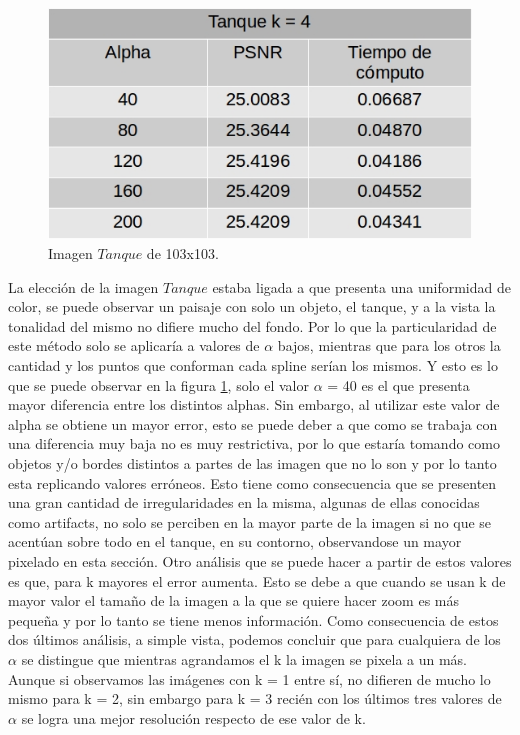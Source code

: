 \documentclass[a4paper]{article}
\newcounter{col}
\begin{document}
\begin{figure}[H]
    \centering
    \includegraphics[scale=0.4]{imagenes/tanque4.jpg}
    \caption{Imagen $Tanque$ de 103x103.}
	\label{tanquee}
    \end{figure}    
    
La elección de la imagen $Tanque$ estaba ligada a que presenta una uniformidad de color, se puede observar un paisaje con solo un objeto, el tanque, y a la vista la tonalidad del mismo no difiere mucho del fondo. Por lo que la particularidad de este método solo se aplicaría a valores de $\alpha$ bajos, mientras que para los otros la cantidad y los puntos que conforman cada spline serían los mismos. Y esto es lo que se puede observar en la figura \ref{tanquee}, solo el valor $\alpha$ = 40 es el que presenta mayor diferencia entre los distintos alphas. Sin embargo, al utilizar este valor de alpha se obtiene un mayor error, esto se puede deber a que como se trabaja con una diferencia muy baja no es muy restrictiva, por lo que estaría tomando como objetos y/o bordes distintos a partes de las imagen que no lo son y por lo tanto esta replicando valores erróneos. Esto tiene como consecuencia que se presenten una gran cantidad de irregularidades en la misma, algunas de ellas conocidas como artifacts, no solo se perciben en la mayor parte de la imagen si no que se acentúan sobre todo en el tanque, en su contorno, observandose un mayor pixelado en esta sección. 
Otro análisis que se puede hacer a partir de estos valores es que, para k mayores el error aumenta. Esto se debe a que cuando se usan k de mayor valor el tamaño de la imagen a la que se quiere hacer zoom es más pequeña y por lo tanto se tiene menos información. Como consecuencia de estos dos últimos análisis, a simple vista, podemos concluir que para cualquiera de los $\alpha$ se distingue que mientras agrandamos el k la imagen se pixela a un más. Aunque si observamos las imágenes con k = 1 entre sí, no difieren de mucho lo mismo para k = 2, sin embargo para k = 3 recién con los últimos tres valores de $\alpha$ se logra una mejor resolución respecto de ese valor de k. 
        
\end{document}
